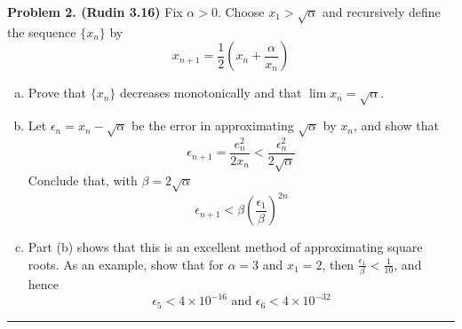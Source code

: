 \documentclass[leqno]{article}
\theoremstyle{nonumberplain}
\begin{document}
\noindent\textbf{Problem 2. (Rudin 3.16)} Fix $\alpha>0$. Choose $x_1 > \sqrt{\alpha}$ and recursively define the sequence $\{x_n\}$ by
\[
x_{n+1}=\frac{1}{2}\left( x_n + \frac{\alpha}{x_n}\right)
\]
\begin{enumerate}[(a)]
\item Prove that $\{x_n\}$ decreases monotonically and that $\lim x_n = \sqrt{\alpha}$. 
\item Let $\epsilon_n=x_n-\sqrt{\alpha}$ be the error in approximating $\sqrt{\alpha}$ by $x_n$, and show that \[\epsilon_{n+1}=\frac{e_n^2}{2x_n}<\frac{\epsilon_n^2}{2\sqrt{\alpha}}\]
Conclude that, with $\beta = 2\sqrt{\alpha}$ \[\epsilon_{n+1}<\beta\left( \frac{\epsilon_1}{\beta}\right)^{2n}\]
\item Part (b) shows that this is an excellent method of approximating square roots. As an example, show that for $\alpha=3$ and $x_1=2$, then $\frac{\epsilon_1}{\beta}<\frac{1}{10}$, and hence
\[
\epsilon_5 < 4 \times 10^{-16} \textrm{ and } \epsilon_6<4\times 10^{-32}
\]
\end{enumerate}

\noindent\rule[0.5ex]{\linewidth}{1pt}
\end{document}
